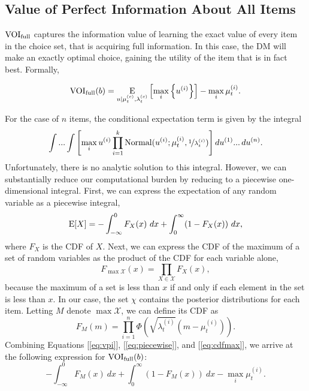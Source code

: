 \subsection{Value of Perfect Information About All Items}
$\text{VOI}_\text{full}$ captures the information value of learning the exact value of every item in the choice set, that is acquiring full information. In this case, the DM will make an exactly optimal choice, gaining the utility of the item that is in fact best. Formally,

\begin{equation}
  \label{eq:vpi}
  \text{VOI}_\text{full}(b)=\operatorname*{E}_{u \mid \mu_{t}^{(c)}, \lambda_{t}^{(c)}} \left[
    \max_{i}\left\{ u^{(i)}\right\}
  \right] -\max_{i}\mu_t^{(i)}.
\end{equation}
%

For the case of $n$ items, the conditional expectation term is given by the integral
%
\begin{equation}
  \int...\int\left[\max_{i}u^{(i)}\prod_{i=1}^{k}\mathrm{Normal}(u^{(i)};\mu_t^{(i)},\nicefrac{1}{\lambda_t^{(i)}})\right]du^{(1)}...\,du^{(n)}.
\end{equation}
%
Unfortunately, there is no analytic solution to this integral. However, we can substantially reduce our computational burden by reducing to a piecewise one-dimensional integral. First, we can express the expectation of any random variable as a piecewise integral,
%
\begin{equation}
  \label{eq:piecewise}
  \E[X]=-\int_{-\infty}^{0}F_{X}(x)\ dx+\int_{0}^{\infty}(1-F_{X}(x))\ dx,
\end{equation}
%
where $F_{X}$ is the CDF of $X$. Next, we can express the CDF of the maximum of a set of random variables as the product of the CDF for each variable alone,
%
\begin{equation}
  \label{eq:cdfmax}
  F_{\max\mathcal{X}}(x)=\prod_{X\in\mathcal{X}}F_{X}(x),
\end{equation}
%
because the maximum of a set is less than $x$ if and only if each element in the set is less than $x$. In our case, the set $\chi$ contains the posterior distributions for each item.
Letting $M$ denote $\max \mathcal{X}$, we can define its CDF as
%
\begin{equation}
  F_{M}(m)=\prod_{i=1}^{n}\Phi\left(\sqrt{\lambda_t^{(i)}}\left(m-\mu_t^{(i)}\right)\right).
\end{equation}
%
Combining Equations [\ref{eq:vpi}], [\ref{eq:piecewise}], and [\ref{eq:cdfmax}], we arrive at the following expression for $\text{VOI}_\text{full}(b)$:
%
\begin{equation}
  -\int_{-\infty}^{0}F_{M}(x)\ dx 
  + \int_{0}^{\infty}(1-F_{M}(x))\ dx
  -\max_{i}\mu_t^{(i)}.
\end{equation}

